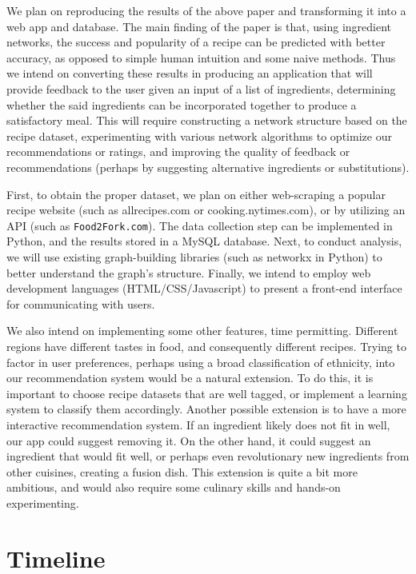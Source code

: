 We plan on reproducing the results of the above paper and transforming it into a web app and database. The main finding of the paper is that, using ingredient networks, the success and popularity of a recipe can be predicted with better accuracy, as opposed to simple human intuition and some naive methods. 
Thus we intend on converting these results in producing an application that will provide feedback to the user given an input of a list of ingredients, determining whether the said ingredients can be incorporated together to produce a satisfactory meal. 
This will require constructing a network structure based on the recipe dataset, experimenting with various network algorithms to optimize our recommendations or ratings, and improving the quality of feedback or recommendations (perhaps by suggesting alternative ingredients or substitutions).

First, to obtain the proper dataset, we plan on either web-scraping a popular recipe website (such as allrecipes.com or cooking.nytimes.com), or by utilizing an API (such as \texttt{Food2Fork.com}). The data collection step can be implemented in Python, and the results stored in a MySQL database. Next, to conduct analysis, we will use existing graph-building libraries (such as networkx in Python) to better understand the graph's structure. Finally, we intend to employ web development languages (HTML/CSS/Javascript) to present a front-end interface for communicating with users.



We also intend on implementing some other features, time permitting. Different regions have different tastes in food, and consequently different recipes. Trying to factor in user preferences, perhaps using a broad classification of ethnicity, into our recommendation system would be a natural extension. To do this, it is important to choose recipe datasets that are well tagged, or implement a learning system to classify them accordingly. Another possible extension is to have a more interactive recommendation system. If an ingredient likely does not fit in well, our app could suggest removing it. On the other hand, it could suggest an ingredient that would fit well, or perhaps even revolutionary new ingredients from other cuisines, creating a fusion dish. This extension is quite a bit more ambitious, and would also require some culinary skills and hands-on experimenting.



\section{Timeline}

